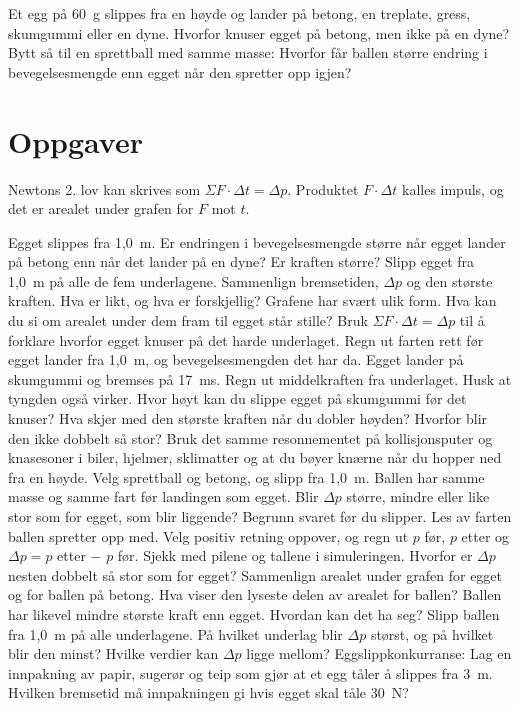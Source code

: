 \documentclass[11pt]{article}
\begin{document}

Et egg på 60~g slippes fra en høyde og lander på betong, en treplate, gress, skumgummi eller en dyne. Hvorfor knuser egget på betong, men ikke på en dyne? Bytt så til en sprettball med samme masse: Hvorfor får ballen større endring i bevegelsesmengde enn egget når den spretter opp igjen?

\section*{Oppgaver}

Newtons 2. lov kan skrives som $ΣF \cdot Δt = Δp$. Produktet $F \cdot Δt$ kalles impuls, og det er arealet under grafen for $F$ mot $t$.

\begin{oppgaveliste}
\oppgave {}Egget slippes fra 1,0~m. Er endringen i bevegelsesmengde større når egget lander på betong enn når det lander på en dyne? Er kraften større?
\svar
\oppgave {}Slipp egget fra 1,0~m på alle de fem underlagene. Sammenlign bremsetiden, $Δp$ og den største kraften. Hva er likt, og hva er forskjellig?
\svar
\oppgave {}Grafene har svært ulik form. Hva kan du si om arealet under dem fram til egget står stille? Bruk $ΣF \cdot Δt = Δp$ til å forklare hvorfor egget knuser på det harde underlaget.
\svar
\oppgave {}Regn ut farten rett før egget lander fra 1,0~m, og bevegelsesmengden det har da. Egget lander på skumgummi og bremses på 17~ms. Regn ut middelkraften fra underlaget. Husk at tyngden også virker.
\svar
\oppgave {}Hvor høyt kan du slippe egget på skumgummi før det knuser? Hva skjer med den største kraften når du dobler høyden? Hvorfor blir den ikke dobbelt så stor?
\svar
\oppgave {}Bruk det samme resonnementet på kollisjonsputer og knasesoner i biler, hjelmer, sklimatter og at du bøyer knærne når du hopper ned fra en høyde.
\svar
\oppgave {}Velg sprettball og betong, og slipp fra 1,0~m. Ballen har samme masse og samme fart før landingen som egget. Blir $Δp$ større, mindre eller like stor som for egget, som blir liggende? Begrunn svaret før du slipper.
\svar
\oppgave {}Les av farten ballen spretter opp med. Velg positiv retning oppover, og regn ut $p$ før, $p$ etter og $Δp = p$ etter − $p$ før. Sjekk med pilene og tallene i simuleringen. Hvorfor er $Δp$ nesten dobbelt så stor som for egget?
\svar
\oppgave {}Sammenlign arealet under grafen for egget og for ballen på betong. Hva viser den lyseste delen av arealet for ballen? Ballen har likevel mindre største kraft enn egget. Hvordan kan det ha seg?
\svar
\oppgave {}Slipp ballen fra 1,0~m på alle underlagene. På hvilket underlag blir $Δp$ størst, og på hvilket blir den minst? Hvilke verdier kan $Δp$ ligge mellom?
\svar
\oppgave {}Eggslippkonkurranse: Lag en innpakning av papir, sugerør og teip som gjør at et egg tåler å slippes fra 3~m. Hvilken bremsetid må innpakningen gi hvis egget skal tåle 30~N?
\svar
\end{oppgaveliste}
\end{document}
